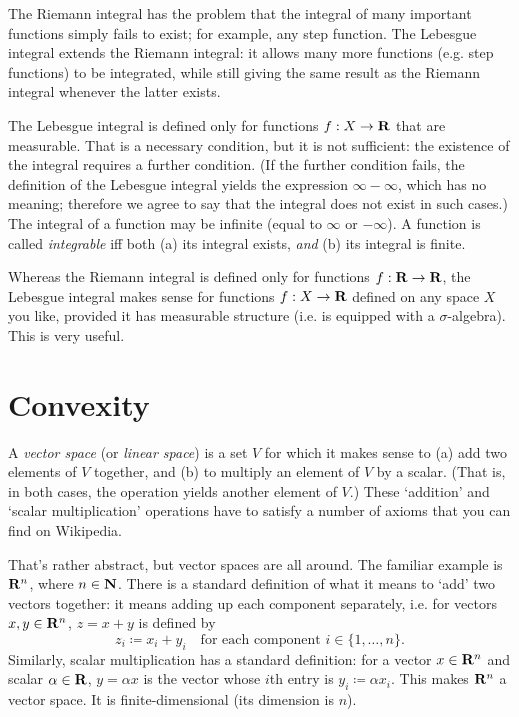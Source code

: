 \documentclass[11pt,letterpaper,reqno,oneside]{book}
\begin{document}
\begin{appendices}
The Riemann integral has the problem that the integral of many important functions simply fails to exist; for example, any step function.
The Lebesgue integral extends the Riemann integral:
it allows many more functions (e.g. step functions) to be integrated,
while still giving the same result as the Riemann integral whenever the latter exists.

The Lebesgue integral is defined only for functions $f : X \to \mathbf{R}$ that are measurable.
That is a necessary condition, but it is not sufficient:
the existence of the integral requires a further condition.
(If the further condition fails, the definition of the Lebesgue integral yields the expression $\infty - \infty$, which has no meaning; therefore we agree to say that the integral does not exist in such cases.)
The integral of a function may be infinite (equal to $\infty$ or $-\infty$).
A function is called \emph{integrable} iff both (a) its integral exists, \emph{and} (b) its integral is finite.

Whereas the Riemann integral is defined only for functions $f : \mathbf{R} \to \mathbf{R}$,
the Lebesgue integral makes sense for functions $f : X \to \mathbf{R}$
defined on any space $X$ you like, provided it has measurable structure (i.e. is equipped with a $\sigma$-algebra).
This is very useful.




\chapter{Convexity}
\label{ch:convexity}

A \emph{vector space} (or \emph{linear space}) is a set $V$ for which it makes sense to (a) add two elements of $V$ together, and (b) to multiply an element of $V$ by a scalar. (That is, in both cases, the operation yields another element of $V$.)
These `addition' and `scalar multiplication' operations have to satisfy a number of axioms that you can find on Wikipedia.

That's rather abstract, but vector spaces are all around.
The familiar example is $\mathbf{R}^n$, where $n \in \mathbf{N}$.
There is a standard definition of what it means to `add' two vectors together: it means adding up each component separately, i.e. for vectors $x,y \in \mathbf{R}^n$, $z = x+y$ is defined by
%
\begin{equation*}
	z_i \coloneqq x_i + y_i
	\quad \text{for each component $i \in \{1,\dots,n\}$.}
\end{equation*}
%
Similarly, scalar multiplication has a standard definition:
for a vector $x \in \mathbf{R}^n$ and scalar $\alpha \in \mathbf{R}$, $y = \alpha x$ is the vector whose $i$th entry is $y_i \coloneqq \alpha x_i$.
This makes $\mathbf{R}^n$ a vector space.
It is finite-dimensional (its dimension is $n$).


\end{appendices}
\end{document}

